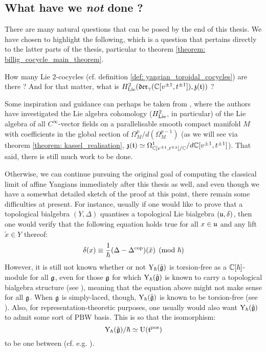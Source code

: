     \subsection{What have we \textit{not} done ?}
        There are many natural questions that can be posed by the end of this thesis. We have chosen to highlight the following, which is a question that pertains directly to the latter parts of the thesis, particular to theorem \ref{theorem: billig_cocycle_main_theorem}.
        \begin{question}
            How many  Lie $2$-cocycles (cf. definition \ref{def: yangian_toroidal_cocycles}) are there ? And for that matter, what is $H^2_{\mathrm{Lie}}(\mathfrak{der}_{\gamma}(\mathbb{C}[v^{\pm 1}, t^{\pm 1}]), \mathfrak{z}(\mathfrak{t}))$ ?
        \end{question}
        Some inspiration and guidance can perhaps be taken from \cite{billig_neeb_vector_field_cyclic_cohomology_parallelisable_manifolds}, where the authors have investigated the Lie algebra cohomology ($H^2_{\mathrm{Lie}}$, in particular) of the Lie algebra of all $C^{\infty}$-vector fields on a parallelisable smooth compact manifold $M$ with coefficients in the global section of $\Omega^p_M/d( \Omega^{p - 1}_M )$ (as we will see via theorem \ref{theorem: kassel_realisation}, $\mathfrak{z}(\mathfrak{t}) \simeq \Omega^1_{ \mathbb{C}[v^{\pm 1}, t^{\pm 1}]/\mathbb{C} }/d \mathbb{C}[v^{\pm 1}, t^{\pm 1}]$). That said, there is still much work to be done.

        Otherwise, we can continue pursuing the original goal of computing the classical limit of affine Yangians immediately after this thesis as well, and even though we have a somewhat detailed sketch of the proof at this point, there remain some difficulties at present. For instance, usually if one would like to prove that a topological bialgebra $(Y, \Delta)$ quantises a topological Lie bialgebra $(\mathfrak{u}, \delta)$, then one would verify that the following equation holds true for all $x \in \mathfrak{u}$ and any lift $\tilde{x} \in Y$ thereof:
            $$\delta(x) \equiv \frac{1}{\hbar}(\Delta - \Delta^{\mathrm{cop}})(\tilde{x}) \pmod{\hbar}$$
        However, it is still not known whether or not $\mathrm{Y}_{\hbar}(\hat{\mathfrak{g}})$ is torsion-free as a $\mathbb{C}[\hbar]$-module for all $\mathfrak{g}$, even for those $\mathfrak{g}$ for which $\mathrm{Y}_{\hbar}(\hat{\mathfrak{g}})$ is known to carry a topological bialgebra structure (see \cite[Section 5]{guay_nakajima_wendlandt_affine_yangian_coproduct}), meaning that the equation above might not make sense for all $\mathfrak{g}$. When $\mathfrak{g}$ is simply-laced, though, $\mathrm{Y}_{\hbar}(\hat{\mathfrak{g}})$ is known to be torsion-free (see \cite[Section 6]{guay_regelskis_wendlandt_affine_yangian_vertex_representations_and_PBW}). Also, for representation-theoretic purposes, one usually would also want $\mathrm{Y}_{\hbar}(\hat{\mathfrak{g}})$ to admit some sort of PBW basis. This is so that the isomorphism:
            $$\mathrm{Y}_{\hbar}(\hat{\mathfrak{g}})/\hbar \simeq \mathrm{U}(\mathfrak{t}^{\mathrm{pos}})$$
        to be one between  (cf. e.g. \cite[Example 0.6]{braverman_gaitsgory_PBW_for_koszul_quadratic_algebras}).


